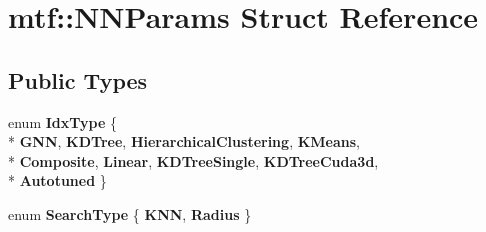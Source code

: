 \hypertarget{structmtf_1_1NNParams}{\section{mtf\-:\-:N\-N\-Params Struct Reference}
\label{structmtf_1_1NNParams}
}
\subsection*{Public Types}
\begin{DoxyCompactItemize}
\item 
enum {\bfseries Idx\-Type} \{ \\*
{\bfseries G\-N\-N}, 
{\bfseries K\-D\-Tree}, 
{\bfseries Hierarchical\-Clustering}, 
{\bfseries K\-Means}, 
\\*
{\bfseries Composite}, 
{\bfseries Linear}, 
{\bfseries K\-D\-Tree\-Single}, 
{\bfseries K\-D\-Tree\-Cuda3d}, 
\\*
{\bfseries Autotuned}
 \}
\item 
enum {\bfseries Search\-Type} \{ {\bfseries K\-N\-N}, 
{\bfseries Radius}
 \}
\end{DoxyCompactItemize}
